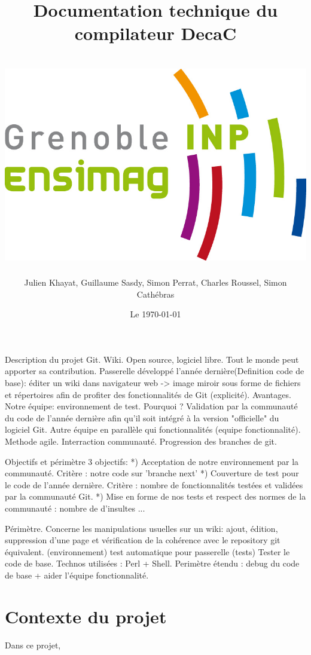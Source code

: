 \documentclass[11pt]{article}
\title{Documentation technique du compilateur DecaC\\
~\\
\includegraphics[scale=0.75]{logo_ensimag.jpg} 
}
\author{Julien Khayat, Guillaume Sasdy, Simon Perrat, Charles Roussel, Simon Cathébras}
\date{Le \today}
\begin{document}
Description du projet
Git. Wiki. Open source, logiciel libre. Tout le monde peut apporter sa contribution. Passerelle développé l'année dernière(Definition code de base):  éditer un wiki dans navigateur web -> image miroir sous forme de fichiers et répertoires afin de profiter des                fonctionnalités de Git (explicité). Avantages.
Notre équipe: environnement de test. Pourquoi ? Validation par la communauté du code de l'année dernière afin qu'il soit     intégré à la version "officielle" du logiciel Git.
Autre équipe en parallèle qui fonctionnalités (equipe fonctionnalité).
Methode agile. Interraction communauté. Progression des branches de git.


Objectifs et périmètre
3 objectifs:
*) Acceptation de notre environnement par la communauté. Critère : notre code sur 'branche next'
*) Couverture de test pour le code de l'année dernière. Critère : nombre de fonctionnalités testées et validées par la       communauté Git.
*) Mise en forme de nos tests et respect des normes de la communauté : nombre de d'insultes ...

Périmètre. Concerne les manipulations usuelles sur un wiki: ajout, édition, suppression d'une page et vérification de la     cohérence avec le repository git équivalent. (environnement)
test automatique pour passerelle (tests)
Tester le code de base. Technos utilisées : Perl + Shell.
Perimètre étendu : debug du code de base + aider l'équipe fonctionnalité.

\section{Contexte du projet}
Dans ce projet, 
\end{document}
